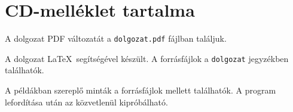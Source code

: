 \newpage
\section*{CD-melléklet tartalma}

A dolgozat PDF változatát a \texttt{dolgozat.pdf} fájlban találjuk.

A dolgozat \LaTeX\ segítségével készült. A forrásfájlok a \texttt{dolgozat} jegyzékben találhatók.


\begin{itemize}

\end{itemize}

A példákban szereplő minták a forrásfájlok mellett találhatók. A program lefordítása után az közvetlenül kipróbálható.
